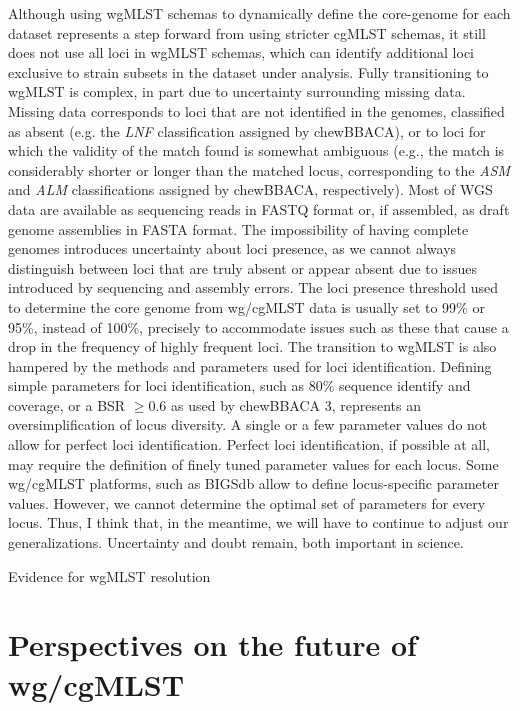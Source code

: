 Although using \ac{wgMLST} schemas to dynamically define the core-genome for each dataset represents a step forward from using stricter \ac{cgMLST} schemas, it still does not use all loci in \ac{wgMLST} schemas, which can identify additional loci exclusive to strain subsets in the dataset under analysis. Fully transitioning to \ac{wgMLST} is complex, in part due to uncertainty surrounding missing data. Missing data corresponds to loci that are not identified in the genomes, classified as absent (e.g. the \textit{LNF} classification assigned by chewBBACA), or to loci for which the validity of the match found is somewhat ambiguous (e.g., the match is considerably shorter or longer than the matched locus, corresponding to the \textit{ASM} and \textit{ALM} classifications assigned by chewBBACA, respectively). Most of \ac{WGS} data are available as sequencing reads in FASTQ format or, if assembled, as draft genome assemblies in FASTA format. The impossibility of having complete genomes introduces uncertainty about loci presence, as we cannot always distinguish between loci that are truly absent or appear absent due to issues introduced by sequencing and assembly errors. The loci presence threshold used to determine the core genome from \ac{wg/cgMLST} data is usually set to 99\% or 95\%, instead of 100\%, precisely to accommodate issues such as these that cause a drop in the frequency of highly frequent loci. The transition to \ac{wgMLST} is also hampered by the methods and parameters used for loci identification. Defining simple parameters for loci identification, such as 80\% sequence identify and coverage, or a \ac{BSR} $\geq0.6$ as used by chewBBACA 3, represents an oversimplification of locus diversity. A single or a few parameter values do not allow for perfect loci identification. Perfect loci identification, if possible at all, may require the definition of finely tuned parameter values for each locus. Some \ac{wg/cgMLST} platforms, such as \ac{BIGSdb} allow to define locus-specific parameter values. However, we cannot determine the optimal set of parameters for every locus. Thus, I think that, in the meantime, we will have to continue to adjust our generalizations. Uncertainty and doubt remain, both important in science.

Evidence for wgMLST resolution \cite{baktash_comparison_nodate, joseph_evaluation_2023, leeper_validation_2025, mixao_multi-country_2025}


\section{Perspectives on the future of wg/cgMLST}


